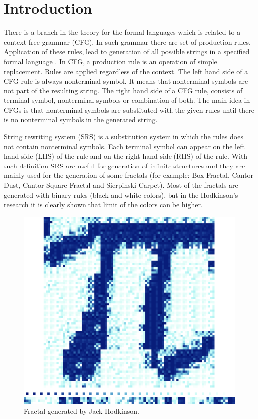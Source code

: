 \documentclass{llncs}
\begin{document}
\section{Introduction} \label{Introduction}

There is a branch in the theory for the formal languages which is related to a context-free grammar (CFG). In such grammar there are set of production rules. Application of these rules, lead to generation of all possible strings in a specified formal language \cite{ochoa01}. In CFG, a production rule is an operation of simple replacement. Rules are applied regardless of the context. The left hand side of a CFG rule is always nonterminal symbol. It means that nonterminal symbols are not part of the resulting string. The right hand side of a CFG rule, consists of terminal symbol, nonterminal symbols or combination of both. The main idea in CFGs is that nonterminal symbols are substituted with the given rules until there is no nonterminal symbols in the generated string.

String rewriting system (SRS) is a substitution system in which the rules does not contain nonterminal symbols. Each terminal symbol can appear on the left hand side (LHS) of the rule and on the right hand side (RHS) of the rule. With such definition SRS are useful for generation of infinite structures and they are mainly used for the generation of some fractals (for example: Box Fractal, Cantor Dust, Cantor Square Fractal and Sierpinski Carpet). Most of the fractals are generated with binary rules (black and white colors), but in the Hodkinson's research it is clearly shown that limit of the colors can be higher.

\begin{figure}[h!]
  \centering
  \includegraphics[width=1.0\linewidth]{pic01}
  \caption{Fractal generated by Jack Hodkinson.}
\label{fig:pic01}
\end{figure}
\end{document}

